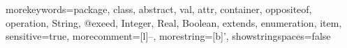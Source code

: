 {morekeywords={package, class, abstract, val, attr, container, oppositeof, operation, String, @exeed, Integer, Real, Boolean, extends, enumeration, item},
sensitive=true,
morecomment=[l]{--},
morestring=[b]',
showstringspaces=false
}
